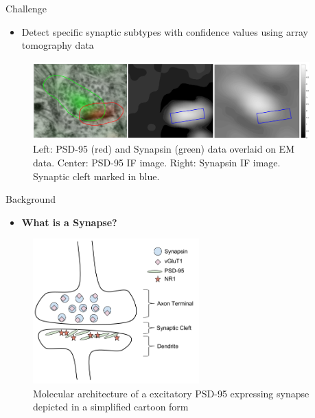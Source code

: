 \documentclass[final, table]{beamer}
\newlength{\sepwid}
\newlength{\onecolwid}
\begin{document}
\begin{frame}[t]  
\begin{columns}[t]  %

\begin{column}{\sepwid}\end{column}  %
\begin{column}{\onecolwid} 

\begin{block}{Challenge} 
\begin{itemize} 
\item Detect specific synaptic subtypes with confidence values using array tomography data
\end{itemize} 


\begin{figure}
\centering
\includegraphics[width=1\textwidth]{figs/em_if_outlines}
\caption{Left: PSD-95 (red) and Synapsin (green) data overlaid on EM data.  Center: PSD-95 IF image. Right: Synapsin IF image. Synaptic cleft marked in blue.}
\label{fig:synapseOverview}
\end{figure}

\end{block}

\begin{block}{Background} 
\begin{itemize} 
\item \textbf{What is a Synapse?}
\end{itemize} 
\begin{figure}
\centering
\includegraphics[width=0.6\textwidth]{figs/Chemical_Synapse}
\caption{Molecular architecture of a excitatory PSD-95 expressing synapse depicted in a simplified cartoon form}
\label{fig:Chemical_Synapse}
\end{figure}


\end{block}
\end{column}
\end{columns}
\end{frame}
\end{document}
